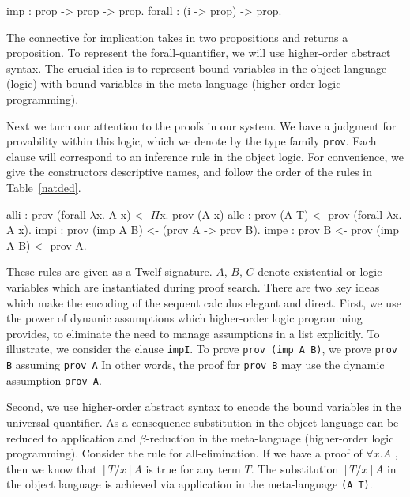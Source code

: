 \documentclass{acmconf}
\newcommand{\z}{\mbox{}}
\begin{document}

\begin{code}
imp    : prop -> prop -> prop.
forall : (i -> prop) -> prop.
\end{code}

The connective for implication takes in two propositions and returns a
proposition. To represent the forall-quantifier, we will use
higher-order abstract syntax. The crucial idea is to represent bound
variables in the object language (logic) with bound variables in the
meta-language (higher-order logic programming). 

Next we turn our attention to the proofs in our system. We have a
judgment for provability within this logic, which we denote by the
type family {\tt prov}.
%
%
Each clause will correspond to an inference rule in the object
logic. For convenience, we give the constructors 
descriptive names, and follow the order of the rules in
Table~\ref{natded}. 

\begin{code}
alli   : prov (forall $\lambda$x. A x)
            <- $\Pi$x. prov (A x)
alle   : prov (A T)
            <- prov (forall $\lambda$x. A x).
\z
impi     : prov (imp A B)
            <- (prov A -> prov B).
impe     : prov B
            <- prov (imp A B)
            <- prov A.
\end{code}


These rules are given as a Twelf signature. $A$, $B$, $C$ denote
existential or logic variables which are instantiated during proof
search. There are two key ideas which make the encoding of the sequent
calculus elegant and direct. First, we use the power of dynamic
assumptions which higher-order logic programming provides, to
eliminate the need to manage assumptions in a list explicitly. To
illustrate, we consider the clause {\tt impI}. To  prove {\tt prov
  (imp A B)}, we prove {\tt prov B} assuming {\tt prov A} In other words,
the proof for {\tt prov B} may use the dynamic assumption {\tt prov A}. 

Second, we use higher-order abstract syntax to encode the bound
variables in the universal quantifier. As a consequence substitution
in the object language can be reduced to application and
$\beta$-reduction in the meta-language (higher-order logic
programming). Consider the rule for all-elimination. If we have a proof of
$\forall x.A$ , then we know that $[T/x]A$ is true for any term
$T$. The substitution $[T/x]A$ in the object language is achieved via
application in the meta-language {\tt (A T)}. 
\end{document}
